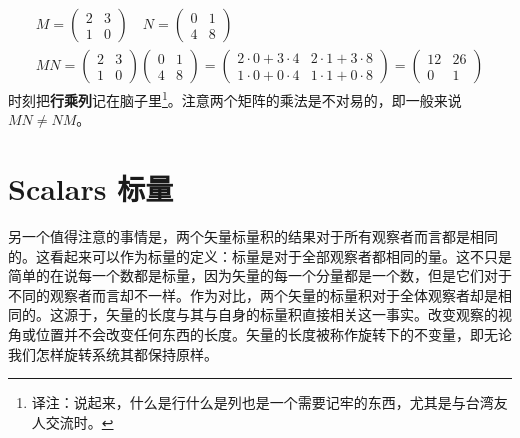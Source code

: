 
\begin{equation}
\begin{aligned}
M= \begin{pmatrix}
2 & 3 \\ 1 & 0
\end{pmatrix} \quad N =
\begin{pmatrix}
0 & 1 \\ 4 & 8
\end{pmatrix} \\
MN = \begin{pmatrix}
2 & 3 \\ 1 & 0
\end{pmatrix}
\begin{pmatrix}
0 & 1 \\ 4 & 8
\end{pmatrix} =
\begin{pmatrix}
2\cdot 0+3\cdot 4 & 2\cdot 1+3\cdot 8 \\ 1\cdot 0+0\cdot 4 & 1\cdot 1+0\cdot 8
\end{pmatrix} =
\begin{pmatrix}
12 & 26 \\ 0 & 1
\end{pmatrix}
\end{aligned}
\end{equation}
时刻把{\bfseries 行乘列}记在脑子里\footnote{译注：说起来，什么是行什么是列也是一个需要记牢的东西，尤其是与台湾友人交流时。}。注意两个矩阵的乘法是不对易的，即一般来说$MN\ne NM$。

\section[标量]{Scalars 标量}\label{appendix.A.4}
另一个值得注意的事情是，两个矢量标量积的结果对于所有观察者而言都是相同的。这看起来可以作为标量的定义：标量是对于全部观察者都相同的量。这不只是简单的在说每一个数都是标量，因为矢量的每一个分量都是一个数，但是它们对于不同的观察者而言却不一样。作为对比，两个矢量的标量积对于全体观察者却是相同的。这源于，矢量的长度与其与自身的标量积直接相关这一事实。改变观察的视角或位置并不会改变任何东西的长度。矢量的长度被称作旋转下的不变量，即无论我们怎样旋转系统其都保持原样。

